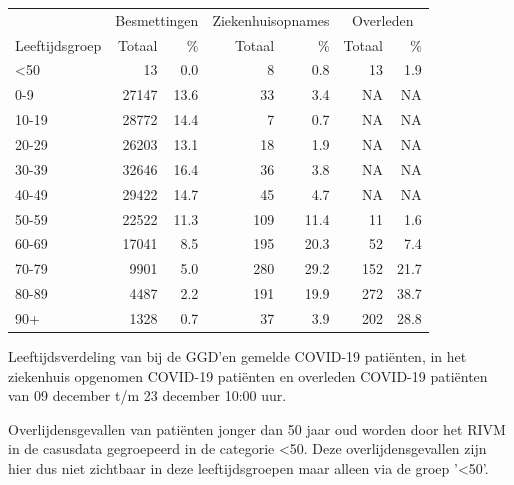 \documentclass[
  english,
  man,floatsintext]{apa6}
\begin{document}
\begin{table}
\centering\begingroup\fontsize{11}{13}\selectfont

\begin{threeparttable}
\begin{tabular}{lrrrrrr}
\toprule
\multicolumn{1}{c}{ } & \multicolumn{2}{c}{Besmettingen} & \multicolumn{2}{c}{Ziekenhuisopnames} & \multicolumn{2}{c}{Overleden} \\
\cmidrule(l{3pt}r{3pt}){2-3} \cmidrule(l{3pt}r{3pt}){4-5} \cmidrule(l{3pt}r{3pt}){6-7}
Leeftijdsgroep & Totaal & \% & Totaal & \% & Totaal & \%\\
\midrule
<50 & 13 & 0.0 & 8 & 0.8 & 13 & 1.9\\
0-9 & 27147 & 13.6 & 33 & 3.4 & NA & NA\\
10-19 & 28772 & 14.4 & 7 & 0.7 & NA & NA\\
20-29 & 26203 & 13.1 & 18 & 1.9 & NA & NA\\
30-39 & 32646 & 16.4 & 36 & 3.8 & NA & NA\\
40-49 & 29422 & 14.7 & 45 & 4.7 & NA & NA\\
50-59 & 22522 & 11.3 & 109 & 11.4 & 11 & 1.6\\
60-69 & 17041 & 8.5 & 195 & 20.3 & 52 & 7.4\\
70-79 & 9901 & 5.0 & 280 & 29.2 & 152 & 21.7\\
80-89 & 4487 & 2.2 & 191 & 19.9 & 272 & 38.7\\
90+ & 1328 & 0.7 & 37 & 3.9 & 202 & 28.8\\
\bottomrule
\end{tabular}
\begin{tablenotes}
\item[1] Leeftijdsverdeling van bij de GGD’en gemelde COVID-19 patiënten, in het ziekenhuis opgenomen COVID-19 patiënten en overleden COVID-19 patiënten van 09 december t/m 23 december 10:00 uur.
\item[2] Overlijdensgevallen van patiënten jonger dan 50 jaar oud worden door het RIVM in de casusdata gegroepeerd in de categorie <50. Deze overlijdensgevallen zijn hier dus niet zichtbaar in deze leeftijdsgroepen maar alleen via de groep '<50'.
\end{tablenotes}
\end{threeparttable}
\endgroup{}
\end{table}

\newpage
\end{document}
